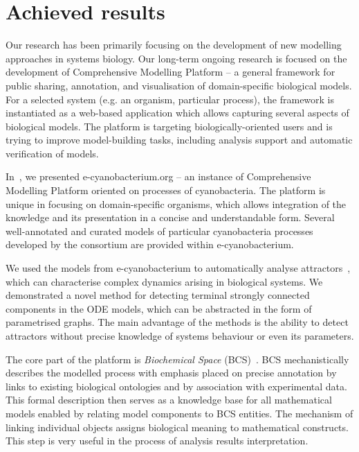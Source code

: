 \documentclass[11pt,a4paper]{report}
\begin{document}

\chapter{Achieved results}

Our research has been primarily focusing on the development of new modelling approaches in systems biology. Our long-term ongoing research is focused on the development of Comprehensive Modelling Platform -- a general framework for public sharing, annotation, and visualisation of domain-specific biological models. For a selected system (e.g. an organism, particular process), the framework is instantiated as a web-based application which allows capturing several aspects of biological models. The platform is targeting biologically-oriented users and is trying to improve model-building tasks, including analysis support and automatic verification of models.

In~\cite{trojak2016cyanobacterium}, we presented e-cyanobacterium.org -- an instance of Comprehensive Modelling Platform oriented on processes of cyanobacteria. The platform is unique in focusing on domain-specific organisms, which allows integration of the knowledge and its presentation in a concise and understandable form. Several well-annotated and curated models of particular cyanobacteria processes developed by the consortium are provided within e-cyanobacterium.

We used the models from e-cyanobacterium to automatically analyse attractors~\cite{benevs2018fully}, which can characterise complex dynamics arising in biological systems. We demonstrated a novel method for detecting terminal strongly connected components in the ODE models, which can be abstracted in the form of parametrised graphs. The main advantage of the methods is the ability to detect attractors without precise knowledge of systems behaviour or even its parameters.

The core part of the platform is \emph{Biochemical Space} (BCS)~\cite{BCS}. BCS mechanistically describes the modelled process with emphasis placed on precise annotation by links to existing biological ontologies and by association with experimental data. This formal description then serves as a knowledge base for all mathematical models enabled by relating model components to BCS entities. The mechanism of linking individual objects assigns biological meaning to mathematical constructs. This step is very useful in the process of analysis results interpretation.
\end{document}
